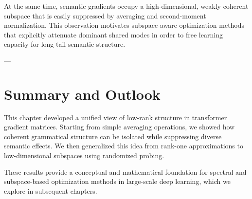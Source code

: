 \documentclass[11pt]{report}
\begin{document}
At the same time, semantic gradients occupy a high-dimensional, weakly coherent
subspace that is easily suppressed by averaging and second-moment normalization.
This observation motivates subspace-aware optimization methods that explicitly
attenuate dominant shared modes in order to free learning capacity for long-tail
semantic structure.

---

\section{Summary and Outlook}
\label{sec:summary_outlook}

This chapter developed a unified view of low-rank structure in transformer gradient
matrices.
Starting from simple averaging operations, we showed how coherent grammatical
structure can be isolated while suppressing diverse semantic effects.
We then generalized this idea from rank-one approximations to low-dimensional
subspaces using randomized probing.

These results provide a conceptual and mathematical foundation for spectral and
subspace-based optimization methods in large-scale deep learning, which we explore
in subsequent chapters.

\newpage
\appendix


\end{document}
